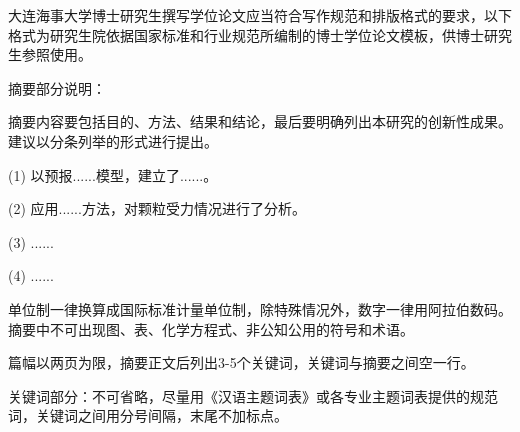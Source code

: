 

大连海事大学博士研究生撰写学位论文应当符合写作规范和排版格式的要求，以下格式为研究生院依据国家标准和行业规范所编制的博士学位论文模板，供博士研究生参照使用。  

摘要部分说明：

摘要内容要包括目的、方法、结果和结论，最后要明确列出本研究的创新性成果。建议以分条列举的形式进行提出。

(1) 以预报......模型，建立了......。 

(2) 应用......方法，对颗粒受力情况进行了分析。

(3) ......

(4) ......

单位制一律换算成国际标准计量单位制，除特殊情况外，数字一律用阿拉伯数码。摘要中不可出现图、表、化学方程式、非公知公用的符号和术语。

篇幅以两页为限，摘要正文后列出3-5个关键词，关键词与摘要之间空一行。

关键词部分：不可省略，尽量用《汉语主题词表》或各专业主题词表提供的规范词，关键词之间用分号间隔，末尾不加标点。

